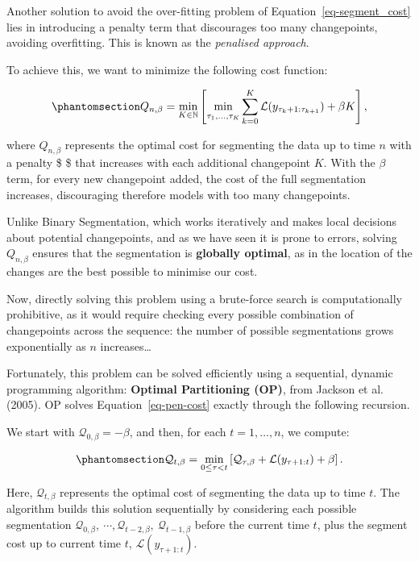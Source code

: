 \documentclass[
  letterpaper,
  DIV=11,
  numbers=noendperiod]{scrreprt}
\begin{document}
Another solution to avoid the over-fitting problem of
Equation~\ref{eq-segment_cost} lies in introducing a penalty term that
discourages too many changepoints, avoiding overfitting. This is known
as the \emph{penalised approach}.

To achieve this, we want to minimize the following cost function:

\begin{equation}\phantomsection\label{eq-pen-cost}{
Q_{n, \beta} = \min_{K \in \mathbb{N}} \left[ \min_{\substack{\\ \tau_1, \dots, \tau_K}} \sum_{k = 0}^K \mathcal{L}(y_{\tau_k+1:\tau_{k+1}}) + \beta K
 \right],
}\end{equation}

where \(Q_{n, \beta}\) represents the optimal cost for segmenting the
data up to time \(n\) with a penalty \$ \beta \$ that increases with
each additional changepoint \(K\). With the \(\beta\) term, for every
new changepoint added, the cost of the full segmentation increases,
discouraging therefore models with too many changepoints.

Unlike Binary Segmentation, which works iteratively and makes local
decisions about potential changepoints, and as we have seen it is prone
to errors, solving \(Q_{n, \beta}\) ensures that the segmentation is
\textbf{globally optimal}, as in the location of the changes are the
best possible to minimise our cost.

Now, directly solving this problem using a brute-force search is
computationally prohibitive, as it would require checking every possible
combination of changepoints across the sequence: the number of possible
segmentations grows exponentially as \(n\) increases\ldots{}

Fortunately, this problem can be solved efficiently using a sequential,
dynamic programming algorithm: \textbf{Optimal Partitioning (OP)}, from
Jackson et al. (2005). OP solves Equation~\ref{eq-pen-cost} exactly
through the following recursion.

We start with \(\mathcal{Q}_{0, \beta} = -\beta\), and then, for each
\(t = 1, \dots, n\), we compute:

\begin{equation}\phantomsection\label{eq-optimal-partitioning}{
    \mathcal{Q}_{t, \beta} = \min_{0 \leq \tau < t} \left[ \mathcal{Q}_{\tau, \beta} + \mathcal{L}(y_{\tau + 1:t}) + \beta \right].
}\end{equation}

Here, \(\mathcal{Q}_{t, \beta}\) represents the optimal cost of
segmenting the data up to time \(t\). The algorithm builds this solution
sequentially by considering each possible segmentation
\(\mathcal{Q}_{0, \beta},\ \cdots, \mathcal{Q}_{t-2, \beta},\ \mathcal{Q}_{t-1, \beta}\)
before the current time \(t\), plus the segment cost up to current time
\(t\), \(\mathcal{L}(y_{\tau + 1:t})\).
\end{document}

